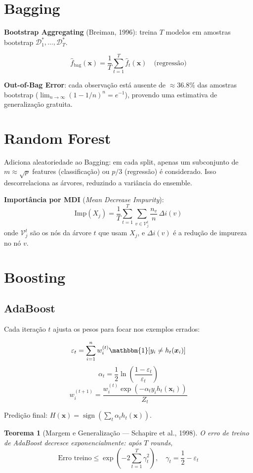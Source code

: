 \documentclass[12pt,a4paper,twoside]{book}
\newtheorem{teorema}{Teorema}[chapter]
\theoremstyle{definition}
\theoremstyle{remark}
\newcommand{\D}{\mathcal{D}}
\newcommand{\bx}{\bm{x}}
\DeclareMathOperator{\sign}{sign}
\begin{document}
\section{Bagging}

\textbf{Bootstrap Aggregating} (Breiman, 1996): treina $T$ modelos em amostras bootstrap $\D_1^*,\ldots,\D_T^*$.

\[
\hat{f}_{\text{bag}}(\bx) = \frac{1}{T}\sum_{t=1}^T \hat{f}_t(\bx) \quad \text{(regressão)}
\]

\textbf{Out-of-Bag Error}: cada observação está ausente de $\approx 36.8\%$ das amostras bootstrap ($\lim_{n\to\infty}(1-1/n)^n = e^{-1}$), provendo uma estimativa de generalização gratuita.

\section{Random Forest}

Adiciona aleatoriedade ao Bagging: em cada split, apenas um subconjunto de $m \approx \sqrt{p}$ features (classificação) ou $p/3$ (regressão) é considerado. Isso descorrelaciona as árvores, reduzindo a variância do ensemble.

\textbf{Importância por MDI} (\textit{Mean Decrease Impurity}):
\[
\mathrm{Imp}(X_j) = \frac{1}{T}\sum_{t=1}^T \sum_{v \in \mathcal{V}_j^t} \frac{n_v}{n}\,\Delta i(v)
\]
onde $\mathcal{V}_j^t$ são os nós da árvore $t$ que usam $X_j$, e $\Delta i(v)$ é a redução de impureza no nó $v$.

\section{Boosting}

\subsection{AdaBoost}

Cada iteração $t$ ajusta os pesos para focar nos exemplos errados:

\[
\varepsilon_t = \sum_{i=1}^n w_i^{(t)} \mathbbm{1}[y_i \neq h_t(\bx_i)]
\]
\[
\alpha_t = \frac{1}{2}\ln\!\left(\frac{1-\varepsilon_t}{\varepsilon_t}\right)
\]
\[
w_i^{(t+1)} = \frac{w_i^{(t)} \exp(-\alpha_t y_i h_t(\bx_i))}{Z_t}
\]

Predição final: $H(\bx) = \sign\!\left(\sum_t \alpha_t h_t(\bx)\right)$.

\begin{teorema}[Margem e Generalização — Schapire et al., 1998]
O erro de treino de AdaBoost decresce exponencialmente: após $T$ rounds,
\[
\text{Erro treino} \leq \exp\!\left(-2\sum_{t=1}^T \gamma_t^2\right), \quad \gamma_t = \frac{1}{2} - \varepsilon_t
\]
\end{teorema}
\end{document}
